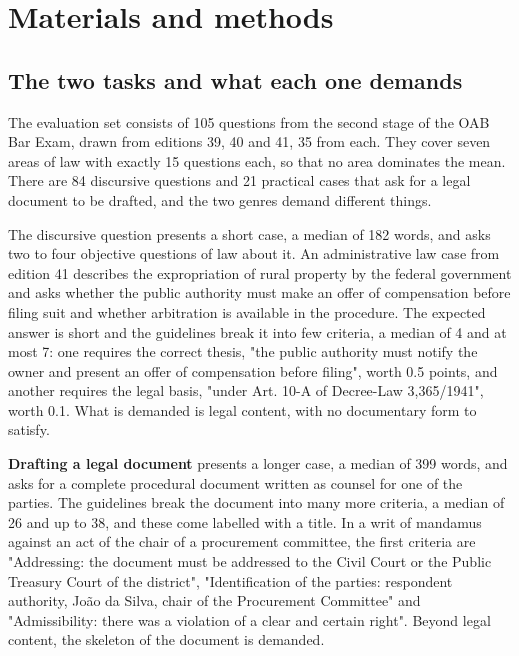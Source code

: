 \documentclass{IOS-Book-Article}
\begin{document}
\section{Materials and methods}

\subsection{The two tasks and what each one demands}

The evaluation set consists of 105 questions from the second stage of the OAB Bar Exam, drawn from editions 39, 40 and 41, 35 from each. They cover seven areas of law with exactly 15 questions each, so that no area dominates the mean. There are 84 discursive questions and 21 practical cases that ask for a legal document to be drafted, and the two genres demand different things.

The discursive question presents a short case, a median of 182 words, and asks two to four objective questions of law about it. An administrative law case from edition 41 describes the expropriation of rural property by the federal government and asks whether the public authority must make an offer of compensation before filing suit and whether arbitration is available in the procedure. The expected answer is short and the guidelines break it into few criteria, a median of 4 and at most 7: one requires the correct thesis, "the public authority must notify the owner and present an offer of compensation before filing", worth 0.5 points, and another requires the legal basis, "under Art. 10-A of Decree-Law 3,365/1941", worth 0.1. What is demanded is legal content, with no documentary form to satisfy.

\textbf{Drafting a legal document} presents a longer case, a median of 399 words, and asks for a complete procedural document written as counsel for one of the parties. The guidelines break the document into many more criteria, a median of 26 and up to 38, and these come labelled with a title. In a writ of mandamus against an act of the chair of a procurement committee, the first criteria are "Addressing: the document must be addressed to the Civil Court or the Public Treasury Court of the district", "Identification of the parties: respondent authority, João da Silva, chair of the Procurement Committee" and "Admissibility: there was a violation of a clear and certain right". Beyond legal content, the skeleton of the document is demanded.
\end{document}
